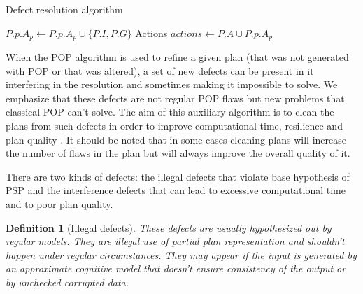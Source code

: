 \documentclass[]{article}
\newtheorem{definition}{Definition}
\begin{document}
\begin{algorithm}\caption{Defect resolution algorithm}\label{defectresolution}\begin{algorithmic}

 \State {}
\State {} \EndFunction

\State {}
\State {}
\State \(P.p.A_p \gets P.p.A_p \cup \{P.I, P.G\}\)
\State {} \State Actions
\(actions \gets P.A \cup P.p.A_p\) 
\State {} \State {}
\EndFor
    \State {} \EndFunction

 \State {}
\State {} \EndFunction

\end{algorithmic}\end{algorithm}

When the POP algorithm is used to refine a given plan (that was not
generated with POP or that was altered), a set of new defects can be
present in it interfering in the resolution and sometimes making it
impossible to solve. We emphasize that these defects are not regular POP
flaws but new problems that classical POP can't solve. The aim of this
auxiliary algorithm is to clean the plans from such defects in order to
improve computational time, resilience and plan quality . It should be
noted that in some cases cleaning plans will increase the number of
flaws in the plan but will always improve the overall quality of it.

There are two kinds of defects: the illegal defects that violate base
hypothesis of PSP and the interference defects that can lead to
excessive computational time and to poor plan quality.

\begin{definition}[Illegal defects]

These defects are usually hypothesized out by regular models. They are
illegal use of partial plan representation and shouldn't happen under
regular circumstances. They may appear if the input is generated by an
approximate cognitive model that doesn't ensure consistency of the
output or by unchecked corrupted data.

\end{definition}
\end{document}
